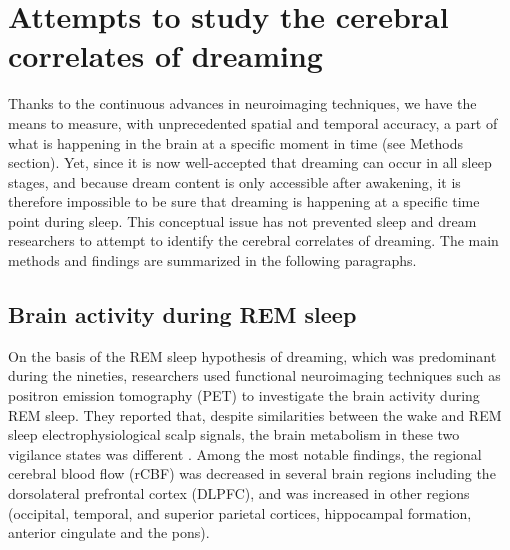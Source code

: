 \section{Attempts to study the cerebral correlates of dreaming}
\label{sec:dream-research:attempts}

Thanks to the continuous advances in neuroimaging techniques, we have the means to measure, with unprecedented spatial and temporal accuracy, a part of what is happening in the brain at a specific moment in time (see Methods section). Yet, since it is now well-accepted that dreaming can occur in all sleep stages, and because dream content is only accessible after awakening, it is therefore impossible to be sure that dreaming is happening at a specific time point during sleep. This conceptual issue has not prevented sleep and dream researchers to attempt to identify the cerebral correlates of dreaming. The main methods and findings are summarized in the following paragraphs.

\subsection{Brain activity during REM sleep}
\label{sec:dream-research:attempts:ba-rem}

On the basis of the REM sleep hypothesis of dreaming, which was predominant during the nineties, researchers used functional neuroimaging techniques such as positron emission tomography (PET) to investigate the brain activity during REM sleep. They reported that, despite similarities between the wake and REM sleep electrophysiological scalp signals, the brain metabolism in these two vigilance states was different \citep{maquet_functional_1996, braun_regional_1997}. Among the most notable findings, the regional cerebral blood flow (rCBF) was decreased in several brain regions including the dorsolateral prefrontal cortex (DLPFC), and was increased in other regions (occipital, temporal, and superior parietal cortices, hippocampal formation, anterior cingulate and the pons).


